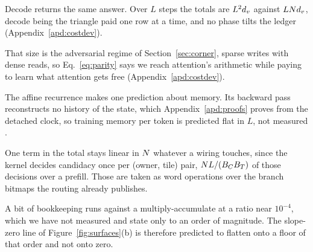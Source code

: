 Decode returns the same answer. Over $L$ steps the totals are $L^2d_v$ against $LNd_v$, decode being the triangle paid one row at a time, and no phase tilts the ledger (Appendix~\ref{apd:costdev}).

That size is the adversarial regime of Section~\ref{sec:corner}, sparse writes with dense reads, so Eq.~\eqref{eq:parity} says we reach attention's arithmetic while paying to learn what attention gets free (Appendix~\ref{apd:costdev}).

The affine recurrence makes one prediction about memory. Its backward pass reconstructs no history of the state, which Appendix~\ref{apd:proofs} proves from the detached clock, so training memory per token is predicted flat in $L$, not measured .

%
One term in the total stays linear in $N$ whatever a wiring touches, since the kernel decides candidacy once per (owner, tile) pair, $N L / (B_C B_T)$ of those decisions over a prefill. Those are taken as word operations over the branch bitmaps the routing already publishes.

A bit of bookkeeping runs against a multiply-accumulate at a ratio near $10^{-4}$, which we have not measured and state only to an order of magnitude. The slope-zero line of Figure~\ref{fig:surfaces}(b) is therefore predicted to flatten onto a floor of that order and not onto zero.

